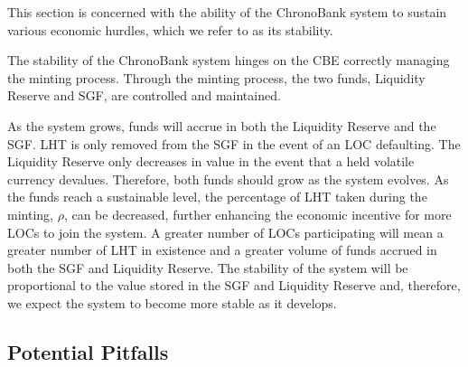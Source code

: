 \begin{multicols}{2}
This section is concerned with the ability of the ChronoBank system to sustain various economic hurdles, which we refer to as its stability.

The stability of the ChronoBank system hinges on the CBE correctly managing the minting process. Through the minting process, the two funds, Liquidity Reserve and SGF, are controlled and maintained. 

As the system grows, funds will accrue in both the Liquidity Reserve and the SGF. LHT is only removed from the SGF in the event of an LOC defaulting. The Liquidity Reserve only decreases in value in the event that a held volatile currency devalues. Therefore, both funds should grow as the system evolves. As the funds reach a sustainable level, the percentage of LHT taken during the minting, $\rho$, can be decreased, further enhancing the economic incentive for more LOCs to join the system. A greater number of LOCs participating will mean a greater number of LHT in existence and a greater volume of funds accrued in both the SGF and Liquidity Reserve. The stability of the system will be proportional to the value stored in the SGF and Liquidity Reserve and, therefore, we expect the system to become more stable as it develops. 

\subsection{Potential Pitfalls}


\end{multicols}

